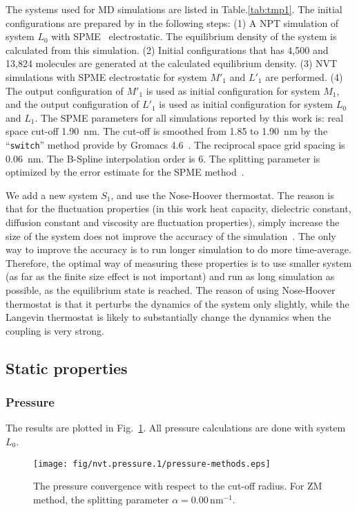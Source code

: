 \documentclass[aip,jcp,a4paper,reprint,unsortedaddress,onecolumn,fleqn]{revtex4-1}
\newcommand{\systemsb}{S_1}
\newcommand{\systemmb}{M_1}
\newcommand{\systemmbp}{M'_1}
\newcommand{\systemla}{L_0}
\newcommand{\systemlbp}{L'_1}
\newcommand{\systemlb}{L_1}
\begin{document}
The systems used for MD simulations are listed in
Table.\ref{tab:tmp1}.  The initial configurations are prepared by in
the following steps: (1) A NPT simulation of system $\systemla$ with SPME~\cite{darden1993pme, essmann1995spm}
electrostatic. The equilibrium density of the system is calculated
from this simulation. (2) Initial configurations that has 4,500 and
13,824 molecules are generated at the calculated equilibrium
density. (3) NVT simulations with SPME electrostatic for system $\systemmbp$
and $\systemlbp$ are performed. (4) The output configuration of $\systemmbp$ is used as
initial configuration for system $\systemmb$, and the output configuration of
$\systemlbp$ is used as initial configuration for system $\systemla$ and $\systemlb$.  The SPME
parameters for all simulations reported by this work is: real space
cut-off 1.90~nm. The cut-off is smoothed from 1.85 to 1.90~nm by the
``\texttt{switch}'' method provide by Gromacs
4.6~\cite{hess2008gromacs, pronk2013gromacs}. The reciprocal space
grid spacing is 0.06~nm. The B-Spline interpolation order is 6. The
splitting parameter is optimized by the error estimate for the SPME method~\cite{wang2010optimizing}.

We add a new system $\systemsb$, and use the Nose-Hoover
thermostat. The reason is that for the fluctuation properties (in this
work heat capacity, dielectric constant, diffusion constant and
viscosity are fluctuation properties), simply increase the size of the
system does not improve the accuracy of the
simulation~\cite{ferrenberg1991statistical}. The only way to improve
the accuracy is to run longer simulation to do more
time-average. Therefore, the optimal way of measuring these properties
is to use smaller system (as far as the finite size effect is not
important) and run as long simulation as possible, as the equilibrium
state is reached. The reason of using Nose-Hoover thermostat is that
it perturbs the dynamics of the system only slightly, while the
Langevin thermostat is likely to substantially change the dynamics
when the coupling is very strong.

\subsection{Static properties}

\subsubsection{Pressure}
The results are plotted in Fig.~\ref{fig:tmp0}. All pressure calculations are done with system $\systemla$.
\begin{figure}
  \centering
  \texttt{[image: fig/nvt.pressure.1/pressure-methods.eps]}
  \caption{The pressure convergence with respect to the cut-off radius.
    For ZM method, the splitting parameter $\alpha = 0.00\,\textrm{nm}^{-1}$.
  }
  \label{fig:tmp0}
\end{figure}
\end{document}
